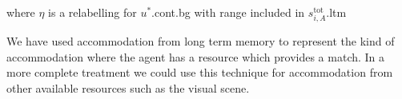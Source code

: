 \begin{sidewaysfigure}
\begin{ex}
  where $\eta$ is a relabelling for $u^*$.cont.bg with range included
  in $s_{i,A}^{\text{tot}}$.ltm
\label{ex:AccLTM}
\end{ex}
\end{sidewaysfigure}
\label{pg:inverserelabelling} 
     
We have used accommodation from long term memory to represent the kind
of accommodation where the agent has a resource which provides a
match.  In a more complete treatment we could use this technique for
accommodation from other available resources such as the visual scene.


